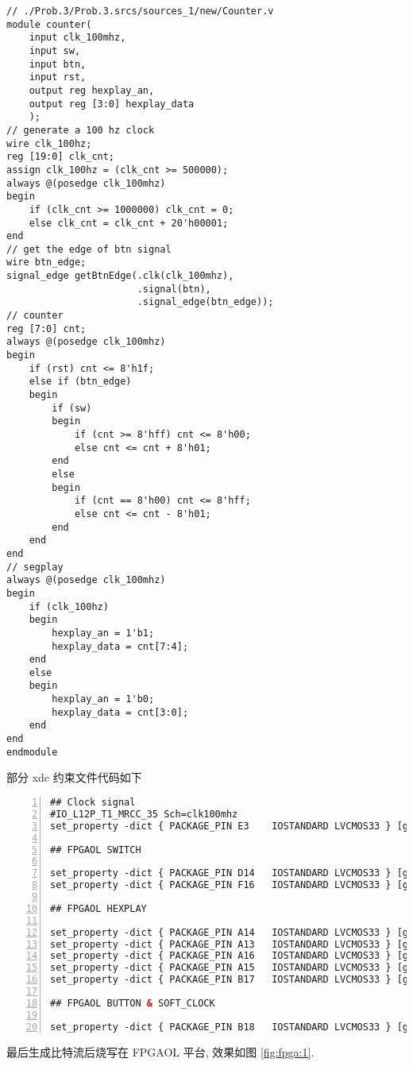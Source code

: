 \documentclass[UTF8,fontset=fandol]{ctexart}
\begin{document}
\begin{ExQuestions}
\begin{lstlisting}[style = verilogstyle, caption = {题目 3. 的 Verilog 代码}, label = {Code:3}]
// ./Prob.3/Prob.3.srcs/sources_1/new/Counter.v
module counter(
    input clk_100mhz,
    input sw,
    input btn,
    input rst,
    output reg hexplay_an,
    output reg [3:0] hexplay_data
    );
// generate a 100 hz clock
wire clk_100hz;
reg [19:0] clk_cnt;
assign clk_100hz = (clk_cnt >= 500000);
always @(posedge clk_100mhz)
begin
    if (clk_cnt >= 1000000) clk_cnt = 0;
    else clk_cnt = clk_cnt + 20'h00001;
end
// get the edge of btn signal
wire btn_edge;
signal_edge getBtnEdge(.clk(clk_100mhz), 
                       .signal(btn), 
                       .signal_edge(btn_edge));
// counter
reg [7:0] cnt;
always @(posedge clk_100mhz)
begin
    if (rst) cnt <= 8'h1f;
    else if (btn_edge)
    begin
        if (sw)
        begin
            if (cnt >= 8'hff) cnt <= 8'h00;
            else cnt <= cnt + 8'h01;
        end
        else
        begin
            if (cnt == 8'h00) cnt <= 8'hff;
            else cnt <= cnt - 8'h01;
        end
    end
end
// segplay
always @(posedge clk_100mhz)
begin
    if (clk_100hz) 
    begin
        hexplay_an = 1'b1;
        hexplay_data = cnt[7:4];
    end
    else
    begin
        hexplay_an = 1'b0;
        hexplay_data = cnt[3:0];
    end
end
endmodule
  \end{lstlisting}
  部分 xdc 约束文件代码如下
  \begin{lstlisting}[basicstyle=\footnotesize\ttfamily, numbers = left, language = XML, frame=lrtb, frameround=tttt, caption={题目 3. 的 xdc 文件}, breaklines=true]
## Clock signal
#IO_L12P_T1_MRCC_35 Sch=clk100mhz
set_property -dict { PACKAGE_PIN E3    IOSTANDARD LVCMOS33 } [get_ports { clk_100mhz }]; 

## FPGAOL SWITCH

set_property -dict { PACKAGE_PIN D14   IOSTANDARD LVCMOS33 } [get_ports { sw }];
set_property -dict { PACKAGE_PIN F16   IOSTANDARD LVCMOS33 } [get_ports { rst }];

## FPGAOL HEXPLAY

set_property -dict { PACKAGE_PIN A14   IOSTANDARD LVCMOS33 } [get_ports { hexplay_data[0] }];
set_property -dict { PACKAGE_PIN A13   IOSTANDARD LVCMOS33 } [get_ports { hexplay_data[1] }];
set_property -dict { PACKAGE_PIN A16   IOSTANDARD LVCMOS33 } [get_ports { hexplay_data[2] }];
set_property -dict { PACKAGE_PIN A15   IOSTANDARD LVCMOS33 } [get_ports { hexplay_data[3] }];
set_property -dict { PACKAGE_PIN B17   IOSTANDARD LVCMOS33 } [get_ports { hexplay_an }];

## FPGAOL BUTTON & SOFT_CLOCK

set_property -dict { PACKAGE_PIN B18   IOSTANDARD LVCMOS33 } [get_ports { btn }];
  \end{lstlisting}
  最后生成比特流后烧写在 FPGAOL 平台, 效果如图 \ref{fig:fpga:1}.


\end{ExQuestions}
\end{document}

